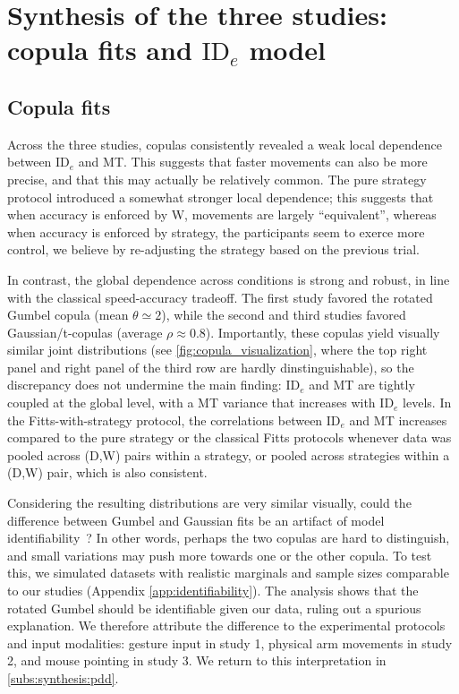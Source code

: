 \documentclass[acmlarge, manuscript,review]{acmart}
\newcommand{\ide}{\ensuremath{{\text{ID}_e}}\xspace}
\begin{document}
\section{Synthesis of the three studies: copula fits and \ide model}

\subsection{Copula fits}
Across the three studies, copulas consistently revealed a weak local dependence between \ide and MT. This suggests that faster movements can also be more precise, and that this may actually be relatively common. The pure strategy protocol introduced a somewhat stronger local dependence; this suggests that when accuracy is enforced by W, movements are largely ``equivalent'', whereas when accuracy is enforced by strategy, the participants seem to exerce more control, we believe \eg by re-adjusting the strategy based on the previous trial.

In contrast, the global dependence across conditions is strong and robust, in line with the classical speed-accuracy tradeoff. The first study favored the rotated Gumbel copula (mean $\theta \simeq 2$), while the second and third studies favored Gaussian/t-copulas (average $\rho \approx 0.8$). Importantly, these copulas yield visually similar joint distributions (see \autoref{fig:copula_visualization}, where the top right panel and right panel of the third row are hardly dinstinguishable), so the discrepancy does not undermine the main finding: \ide and MT are tightly coupled at the global level, with a MT variance that increases with \ide levels. In the Fitts-with-strategy protocol, the correlations between \ide and MT increases compared to the pure strategy or the classical Fitts protocols whenever data was pooled across (D,W) pairs within a strategy, or pooled across strategies within a (D,W) pair, which is also consistent.

Considering the resulting distributions are very similar visually, could the difference between Gumbel and Gaussian fits be an artifact of model identifiability~\cite{gori2024, wilson2019}? In other words, perhaps the two copulas are hard to distinguish, and small variations may push more towards one or the other copula. To test this, we simulated datasets with realistic marginals and sample sizes comparable to our studies (Appendix \ref{app:identifiability}). The analysis shows that the rotated Gumbel should be identifiable given our data, ruling out a spurious explanation. We therefore attribute the difference to the experimental protocols and input modalities: gesture input in study 1, physical arm movements in study 2, and mouse pointing in study 3. We return to this interpretation in \autoref{subs:synthesis:pdd}.
\end{document}
